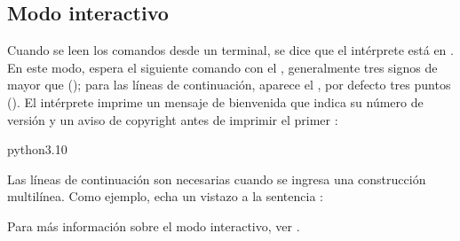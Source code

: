 \documentclass[a4,10pt,spanish]{sphinxmanual}
\begin{document}
\subsection{Modo interactivo}
\label{\detokenize{tutorial/interpreter:interactive-mode}}\label{\detokenize{tutorial/interpreter:tut-interactive}}
\sphinxAtStartPar
Cuando se leen los comandos desde un terminal, se dice que el intérprete está en . En este modo, espera el siguiente comando con el , generalmente tres signos de mayor que (\sphinxcode{\sphinxupquote{>>>}}); para las líneas de continuación, aparece el , por defecto tres puntos (). El intérprete imprime un mensaje de bienvenida que indica su número de versión y un aviso de copyright antes de imprimir el primer :

\begin{sphinxVerbatim}[commandchars=\\\{\}]
 python3.10
\PYGZgt{}\PYGZgt{}
\end{sphinxVerbatim}

\sphinxAtStartPar
Las líneas de continuación son necesarias cuando se ingresa una construcción multilínea. Como ejemplo, echa un vistazo a la sentencia :

\begin{sphinxVerbatim}[commandchars=\\\{\}]
  
 
    
\end{sphinxVerbatim}

\sphinxAtStartPar
Para más información sobre el modo interactivo, ver {\hyperref[\detokenize{tutorial/appendix:tut-interac}]{}}.
\end{document}

